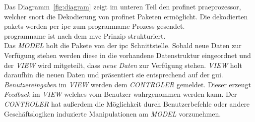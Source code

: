 Das Diagramm~\ref{fig:diagram} zeigt im unteren Teil den \gls{profinet} \gls{praeprozessor}, welcher \gls{snort} die Dekodierung von \gls{profinet} Paketen ermöglicht. Die dekodierten \glspl{paket} werden per \gls{ipc} zum \gls{programname} Prozess gesendet.\\
\Gls{programname} ist nach dem \gls{mvc} Prinzip strukturiert.\\
Das \textit{MODEL} holt die Pakete von der \gls{ipc} Schnittstelle. Sobald neue Daten zur Verfügung stehen werden diese in die vorhandene Datenstruktur eingeordnet und der \textit{VIEW} wird mitgeteilt, dass \textit{neue Daten} zur Verfügung stehen. \textit{VIEW} holt daraufhin die neuen Daten und präsentiert sie entsprechend auf der \gls{gui}.\\
\textit{Benutzereingaben} im \textit{VIEW} werden dem \textit{CONTROLER} gemeldet. Dieser erzeugt \textit{Feedback} im \textit{VIEW} welches vom Benutzer wahrgenommen werden kann. Der \textit{CONTROLER} hat außerdem die Möglichkeit durch Benutzerbefehle oder andere Geschäftslogiken induzierte Manipulationen am \textit{MODEL} vorzunehmen.

 